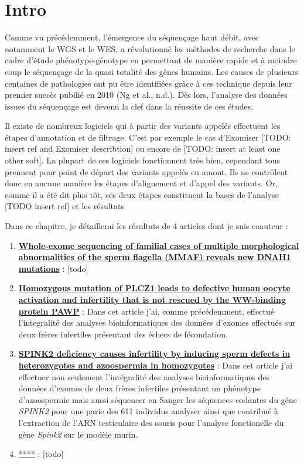 \documentclass[12pt,twoside]{reedthesis}
\providecommand{\tightlist}{%
  \setlength{\itemsep}{0pt}\setlength{\parskip}{0pt}}
\theoremstyle{definition}
\theoremstyle{definition}
\theoremstyle{remark}
\begin{document}
  \section{Intro}\label{intro}
  
  Comme vu précédemment, l'émergence du séquençage haut débit, avec
  notamment le WGS et le WES, a révolutionné les méthodes de recherche
  dans le cadre d'étude phénotype-génotype en permettant de manière rapide
  et à moindre coup le séquençage de la quasi totalité des gènes humains.
  Les causes de plusieurs centaines de pathologies ont pu être identifiées
  grâce à ces technique depuis leur premier succès pubilié en 2010 (Ng et
  al., n.d.). Dès lors, l'analyse des données issues du séquençage est
  devenu la clef dans la réussite de ces études.
  
  Il existe de nombreux logiciels qui à partir des variants appelés
  effectuent les étapes d'annotation et de filtrage. C'est par exemple le
  cas d'Exomiser {[}TODO: insert ref and Exomiser describtion{]} ou encore
  de {[}TODO: insert at least one other soft{]}. La plupart de ces
  logiciels fonctionnent très bien, cependant tous prennent pour point de
  départ des variants appelés en amont. Ils ne contrôlent donc en aucune
  manière les étapes d'alignement et d'appel des variants. Or, comme il a
  été dit plus tôt, ces deux étapes constituent la bases de l'analyse
  {[}TODO insert ref{]} et les résultats
  
  Dans ce chapitre, je détaillerai les résultats de 4 articles dont je
  suis coauteur :
  
  \begin{enumerate}
  \def\labelenumi{\arabic{enumi}.}
  \tightlist
  \item
    \protect\hyperlink{famdnah1}{\textbf{Whole-exome sequencing of
    familial cases of multiple morphological abnormalities of the sperm
    flagella (MMAF) reveals new DNAH1 mutations}} : {[}todo{]}
  \item
    \protect\hyperlink{plcz}{\textbf{Homozygous mutation of PLCZ1 leads to
    defective human oocyte activation and infertility that is not rescued
    by the WW-binding protein PAWP}} : Dans cet article j'ai, comme
    précédemment, effectué l'integralité des analyses bioinformatiques des
    données d'exomes effectués sur deux frères infertiles présentant des
    échecs de fécondation.\\
  \item
    \protect\hyperlink{spink2}{\textbf{SPINK2 deficiency causes
    infertility by inducing sperm defects in heterozygotes and azoospermia
    in homozygotes}} : Dans cet article j'ai effectuer non seulement
    l'intégralité des analyses bioinformatiques des données d'exomes de
    deux frères infertiles présentant un phénotype d'azoospermie mais
    aussi séquencer en Sanger les séquences codantes du gène \emph{SPINK2}
    pour une parie des 611 individus analyser ainsi que contribué à
    l'extraction de l'ARN testiculaire des souris pour l'analyse
    fonctionelle du gène \emph{Spink2} sur le modèle murin.\\
  \item
    \protect\hyperlink{cohortemmah}{****} : {[}todo{]}
  \end{enumerate}
  
\end{document}
